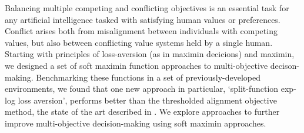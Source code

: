 
Balancing multiple competing and conflicting objectives is an essential task for any artificial intelligence tasked with satisfying human values or preferences. Conflict arises both from misalignment between individuals with competing values, but also between conflicting value systems held by a single human. Starting with principles of loss-aversion (as in maximin decicions) and maximin, we designed a set of soft maximin function approaches to multi-objective decison-making. Benchmarking these functions in a set of previously-developed environments, we found that one new approach in particular, `split-function exp-log loss aversion', performs better than the thresholded alignment objective method, the state of the art described in \cite{vamplew_potential-based_2021}. We explore approaches to further improve multi-objective decision-making using soft maximin approaches.


